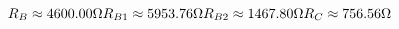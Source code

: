 \[
R_{B} \approx 4600.00 \Omega \\ 
R_{B1} \approx 5953.76 \Omega \\ 
R_{B2} \approx 1467.80 \Omega \\ 
R_{C} \approx 756.56 \Omega \\ 
\]